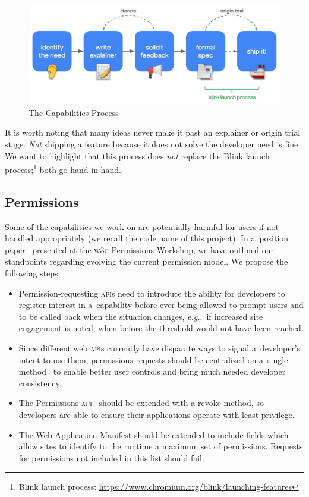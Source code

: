 \documentclass[sigconf]{acmart}
\begin{document}
\begin{figure}[hbt]
  \includegraphics[trim={0 0.5cm 0 0},clip,width=0.925\columnwidth]{capabilities-process.jpg}
  \caption{The Capabilities Process}
  \label{fig:fuguprocess}
\end{figure}

It is worth noting that many ideas never make it past an explainer or origin trial stage.
\textit{Not} shipping a feature because it does not solve the developer need is fine.
We want to highlight that this process does \textit{not} replace the Blink launch
process;\footnote{Blink launch process: \url{https://www.chromium.org/blink/launching-features}}
both go hand in hand.

\subsection{Permissions}

Some of the capabilities we work on are potentially harmful for users
if not handled appropriately (we recall the code name of this project).
In a~position paper~\cite{russell18} presented at the \textsc{w3c} Permissions Workshop,
we have outlined our standpoints regarding evolving the current permission model.
We propose the following steps:

\begin{itemize}
  \item Permission-requesting \textsc{api}s need to introduce the ability for
    developers to register interest in a~capability before ever being allowed to prompt users
    and to be called back when the situation changes, \textit{e.g.},\
    if increased site engagement is noted, when before the threshold would not have been reached.
  \item Since different web \textsc{api}s currently have disparate ways to signal
    a~developer's intent to use them, permissions requests should be centralized
    on a~single method~\cite{yasskin17} to enable
    better user controls and bring much needed developer consistency.
  \item The Permissions \textsc{api}~\cite{lamouri19} should be extended with a revoke method,
    so developers are able to ensure their applications operate with least-privilege.
  \item The Web Application Manifest should be extended to include fields
    which allow sites to identify to the runtime a maximum set of permissions.
    Requests for permissions not included in this list should fail.
\end{itemize}
\end{document}
